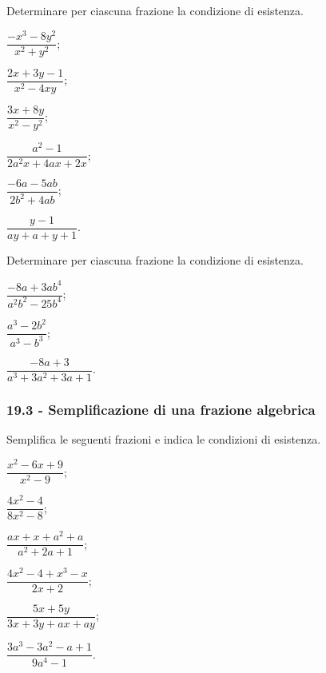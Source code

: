 \begin{esercizio}
\label{ese:19.3}
Determinare per ciascuna frazione la condizione di esistenza.
\begin{multicols}{3}
\begin{enumeratea}
 \item $\dfrac{-x^{{3}}-8y^{{2}}}{x^{{2}}+y^{{2}}}$;
 \item $\dfrac{2x+3y-1}{x^{2}-4xy}$;
 \item $\dfrac{3x+8y}{x^{2}-y^{2}}$;
 \item $\dfrac{a^{2}-1}{2a^{2}x+4ax+2x}$;
 \item $\dfrac{-6a-5ab}{2b^{2}+4ab}$;
 \item $\dfrac{y-1}{ay+a+y+1}$.
\end{enumeratea}
\end{multicols}
\end{esercizio}

\begin{esercizio}
\label{ese:19.4}
Determinare per ciascuna frazione la condizione di esistenza.
\begin{multicols}{3}
\begin{enumeratea}
 \item $\dfrac{-8a+3ab^{4}}{a^{2}b^{2}-25b^{4}}$;
 \item $\dfrac{a^{3}-2b^{2}}{a^{3}-b^{3}}$;
 \item $\dfrac{-8a+3}{a^{3}+3a^{2}+3a+1}$.
\end{enumeratea}
\end{multicols}
\end{esercizio}

\subsubsection*{19.3 - Semplificazione di una frazione algebrica}

\begin{esercizio}[\Ast]
\label{ese:19.5}
Semplifica le seguenti frazioni e indica le condizioni di esistenza.
\begin{multicols}{3}
\begin{enumeratea}
 \item $\dfrac{x^{2}-6x+9}{x^{2}-9}$;
 \item $\dfrac{4x^{2}-4}{8x^{2}-8}$;
 \item $\dfrac{ax+x+a^{2}+a}{a^{2}+2a+1}$;
 \item $\dfrac{4x^{2}-4+x^{3}-x}{2x+2}$;
 \item $\dfrac{5x+5y}{3x+3y+ax+ay}$;
 \item $\dfrac{3a^{3}-3a^{2}-a+1}{9a^{4}-1}$.
\end{enumeratea}
\end{multicols}
\end{esercizio}

